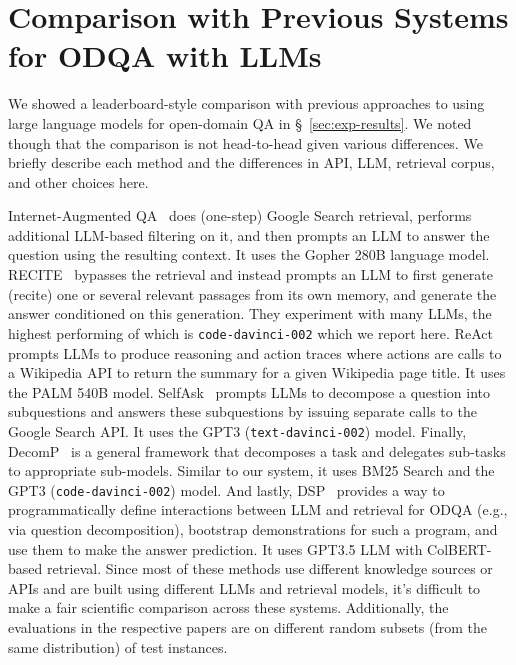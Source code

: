 \section{Comparison with Previous Systems for ODQA with LLMs}
\label{sec:sota-differences}

We showed a leaderboard-style comparison with previous approaches to using large language models for open-domain QA in \S~\ref{sec:exp-results}. We noted though that the comparison is not head-to-head given various differences. We briefly describe each method and the differences in API, LLM, retrieval corpus, and other choices here.

Internet-Augmented QA~\cite{internet-augmented-qa} does (one-step) Google Search retrieval, performs additional LLM-based filtering on it, and then prompts an LLM to answer the question using the resulting context. It uses the Gopher 280B language model. RECITE~\cite{recitationlm} bypasses the retrieval and instead prompts an LLM to first generate (recite) one or several relevant passages from its own memory, and generate the answer conditioned on this generation. They experiment with many LLMs, the highest performing of which is \texttt{code-davinci-002} which we report here. ReAct~\cite{react} prompts LLMs to produce reasoning and action traces where actions are calls to a Wikipedia API to return the summary for a given Wikipedia page title. It uses the PALM 540B model. SelfAsk~\cite{selfask} prompts LLMs to decompose a question into subquestions and answers these subquestions by issuing separate calls to the Google Search API. It uses the GPT3 (\texttt{text-davinci-002}) model. Finally, DecomP~\cite{decomp} is a general framework that decomposes a task and delegates sub-tasks to appropriate sub-models. Similar to our system, it uses BM25 Search and the GPT3 (\texttt{code-davinci-002}) model. And lastly, DSP~\cite{dsp} provides a way to programmatically define interactions between LLM and retrieval for ODQA (e.g., via question decomposition), bootstrap demonstrations for such a program, and use them to make the answer prediction. It uses GPT3.5 LLM with ColBERT-based retrieval. Since most of these methods use different knowledge sources or APIs and are built using different LLMs and retrieval models, it's difficult to make a fair scientific comparison across these systems. Additionally, the evaluations in the respective papers are on different random subsets (from the same distribution) of test instances. 

